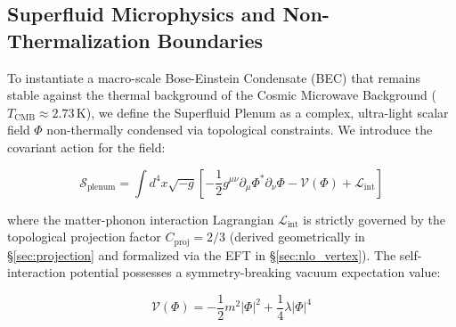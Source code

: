 \documentclass[aps,prd,10pt,twocolumn,superscriptaddress,nofootinbib,floatfix]{revtex4-2}
\begin{document}
\subsection{\label{sec:microphysics}Superfluid Microphysics and Non-Thermalization Boundaries}

To instantiate a macro-scale Bose-Einstein Condensate (BEC) that remains stable against the thermal background of the Cosmic Microwave Background ($T_{\text{CMB}} \approx 2.73\,\text{K}$), we define the Superfluid Plenum as a complex, ultra-light scalar field $\Phi$ non-thermally condensed via topological constraints. We introduce the covariant action for the field:

\begin{equation}
\mathcal{S}_{\text{plenum}} = \int d^4x \sqrt{-g} \left[ -\frac{1}{2} g^{\mu\nu} \partial_\mu \Phi^* \partial_\nu \Phi - \mathcal{V}(\Phi) + \mathcal{L}_{\text{int}} \right]
\end{equation}

where the matter-phonon interaction Lagrangian $\mathcal{L}_{\text{int}}$ is strictly governed by the topological projection factor $C_{\text{proj}} = 2/3$ (derived geometrically in \S\ref{sec:projection} and formalized via the EFT in \S\ref{sec:nlo_vertex}). The self-interaction potential possesses a symmetry-breaking vacuum expectation value:

\begin{equation}
\mathcal{V}(\Phi) = -\frac{1}{2} m^2 |\Phi|^2 + \frac{1}{4} \lambda |\Phi|^4
\end{equation}
\end{document}
